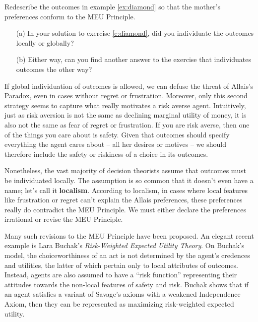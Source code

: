 \begin{exercise}{1}\label{e:diamond}
  Redescribe the outcomes in example \ref{ex:diamond} so that the
  mother's preferences conform to the MEU Principle.
\end{exercise}

\begin{exercise}{2}
  \leavevmode\vspace{-2em}
  \begin{enumerate}
  \itemsep0em 
  \item[(a)] In your solution to exercise \ref{e:diamond}, did you
    individuate the outcomes locally or globally?
  \item[(b)] Either way, can you find another answer to the exercise that
    individuates outcomes the other way?
  \end{enumerate}
  \vspace{-2em}
\end{exercise}

If global individuation of outcomes is allowed, we can defuse the
threat of Allais's Paradox, even in cases without regret or
frustration. Moreover, only this second strategy seems to capture what
really motivates a risk averse agent. Intuitively, just as risk
aversion is not the same as declining marginal utility of money, it is
also not the same as fear of regret or frustration. If you are risk
averse, then one of the things you care about is safety. Given that
outcomes should specify everything the agent cares about -- all her
desires or motives -- we should therefore include the safety or
riskiness of a choice in its outcomes.

Nonetheless, the vast majority of decision theorists assume that
outcomes must be individuated locally. The assumption is so common
that it doesn't even have a name; let's call it
\textbf{localism}. According to localism, in cases where local
features like frustration or regret can't explain the Allais
preferences, these preferences really do contradict the MEU
Principle. We must either declare the preferences irrational or revise
the MEU Principle.

Many such revisions to the MEU Principle have been proposed. An
elegant recent example is Lara Buchak's \emph{Risk-Weighted
  Expected Utility Theory}. On Buchak's model, the choiceworthiness of an
act is not determined by the agent's credences and utilities, the
latter of which pertain only to local attributes of outcomes. Instead,
agents are also assumed to have a ``risk function'' representing their
attitudes towards the non-local features of safety and risk. Buchak
shows that if an agent satisfies a variant of Savage's axioms with a
weakened Independence Axiom, then they can be represented as
maximizing risk-weighted expected utility.

